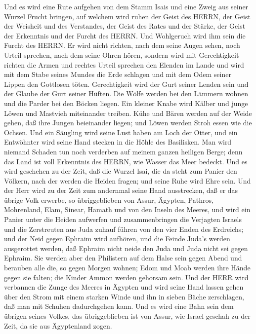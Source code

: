  Und es wird eine Rute aufgehen von dem Stamm Isais und eine
Zweig aus seiner Wurzel Frucht bringen,  auf welchem wird
ruhen der Geist des HERRN, der Geist der Weisheit und des Verstandes,
der Geist des Rates und der Stärke, der Geist der Erkenntnis und der
Furcht des HERRN.  Und Wohlgeruch wird ihm sein die Furcht
des HERRN. Er wird nicht richten, nach dem seine Augen sehen, noch
Urteil sprechen, nach dem seine Ohren hören,  sondern wird
mit Gerechtigkeit richten die Armen und rechtes Urteil sprechen den
Elenden im Lande und wird mit dem Stabe seines Mundes die Erde schlagen
und mit dem Odem seiner Lippen den Gottlosen töten. 
Gerechtigkeit wird der Gurt seiner Lenden sein und der Glaube der Gurt
seiner Hüften.  Die Wölfe werden bei den Lämmern wohnen und
die Parder bei den Böcken liegen. Ein kleiner Knabe wird Kälber und
junge Löwen und Mastvieh miteinander treiben.  Kühe und
Bären werden auf der Weide gehen, daß ihre Jungen beieinander liegen;
und Löwen werden Stroh essen wie die Ochsen.  Und ein
Säugling wird seine Lust haben am Loch der Otter, und ein Entwöhnter
wird seine Hand stecken in die Höhle des Basilisken.  Man
wird niemand Schaden tun noch verderben auf meinem ganzen heiligen
Berge; denn das Land ist voll Erkenntnis des HERRN, wie Wasser das Meer
bedeckt.  Und es wird geschehen zu der Zeit, daß die Wurzel
Isai, die da steht zum Panier den Völkern, nach der werden die Heiden
fragen; und seine Ruhe wird Ehre sein.  Und der Herr wird
zu der Zeit zum andernmal seine Hand ausstrecken, daß er das übrige Volk
erwerbe, so übriggeblieben von Assur, Ägypten, Pathros, Mohrenland,
Elam, Sinear, Hamath und von den Inseln des Meeres,  und
wird ein Panier unter die Heiden aufwerfen und zusammenbringen die
Verjagten Israels und die Zerstreuten aus Juda zuhauf führen von den
vier Enden des Erdreichs;  und der Neid gegen Ephraim wird
aufhören, und die Feinde Juda's werden ausgerottet werden, daß Ephraim
nicht neide den Juda und Juda nicht sei gegen Ephraim.  Sie
werden aber den Philistern auf dem Halse sein gegen Abend und berauben
alle die, so gegen Morgen wohnen; Edom und Moab werden ihre Hände gegen
sie falten; die Kinder Ammon werden gehorsam sein.  Und der
HERR wird verbannen die Zunge des Meeres in Ägypten und wird seine Hand
lassen gehen über den Strom mit einem starken Winde und ihn in sieben
Bäche zerschlagen, daß man mit Schuhen dadurchgehen kann. 
Und es wird eine Bahn sein dem übrigen seines Volkes, das übriggeblieben
ist von Assur, wie Israel geschah zu der Zeit, da sie aus Ägyptenland
zogen.

